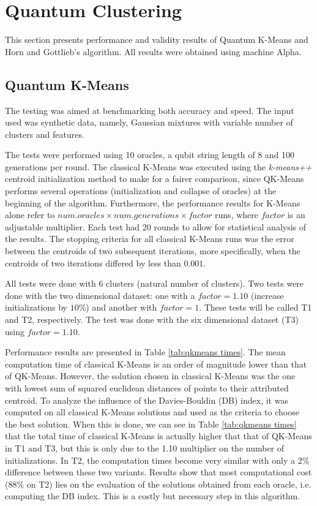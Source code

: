 
\section{Quantum Clustering}

This section presents performance and validity results of Quantum K-Means and Horn and Gottlieb's algorithm.
All results were obtained using machine Alpha.

\subsection{Quantum K-Means}

The testing was aimed at benchmarking both accuracy and speed.
The input used was synthetic data, namely, Gaussian mixtures with variable number of clusters and features.

The tests were performed using 10 oracles, a qubit string length of 8 and 100 generations per round.
The classical K-Means was executed using the \emph{k-means++} centroid initialization method to make for a fairer comparison, since QK-Means performs several operations (initialization and collapse of oracles) at the beginning of the algorithm.
Furthermore, the performance results for K-Means alone refer to $num.oracles \times num.generations \times factor$ runs, where $factor$ is an adjustable multiplier.
Each test had 20 rounds to allow for statistical analysis of the results. %
The stopping criteria for all classical K-Means runs was the error between the centroids of two subsequent iterations, more specifically, when the centroids of two iterations differed by less than $0.001$.

All tests were done with 6 clusters (natural number of clusters).
Two tests were done with the two dimensional dataset: one with a $factor=1.10$ (increase initializations by $10\%$) and another with $factor=1$.
These tests will be called T1 and T2, respectively.
The test was done with the six dimensional dataset (T3) using $factor=1.10$.

Performance results are presented in Table \ref{tab:qkmeans times}.
The mean computation time of classical K-Means is an order of magnitude lower than that of QK-Means.
However, the solution chosen in classical K-Means was the one with lowest sum of squared euclidean distances of points to their attributed centroid.
To analyze the influence of the Davies-Bouldin (DB) index, it was computed on all classical K-Means solutions and used as the criteria to choose the best solution.
When this is done, we can see in Table \ref{tab:qkmeans times} that the total time of classical K-Means is actually higher that that of QK-Means in T1 and T3, but this is only due to the 1.10 multiplier on the number of initializations.
In T2, the computation times become very similar with only a 2\% difference between these two variants.
Results show that most computational cost (88\% on T2) lies on the evaluation of the solutions obtained from each oracle, i.e. computing the DB index.
This is a costly but necessary step in this algorithm.

